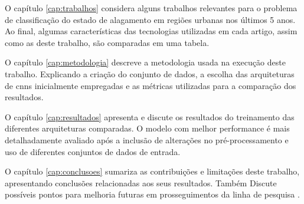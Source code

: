 O capítulo \ref{cap:trabalhos} considera alguns trabalhos relevantes para o problema de classificação do estado de alagamento em regiões urbanas nos últimos 5 anos. 
Ao final, algumas características das tecnologias utilizadas em cada artigo, assim como as deste trabalho, são comparadas em uma tabela.

O capítulo \ref{cap:metodologia} descreve a metodologia usada na execução deste trabalho. 
Explicando a criação do conjunto de dados, a escolha das arquiteturas de \acrshort{cnn}s inicialmente empregadas e as métricas utilizadas para a comparação dos resultados.

O capítulo \ref{cap:resultados} apresenta e discute os resultados do treinamento das diferentes arquiteturas comparadas. 
O modelo com melhor performance é mais detalhadamente avaliado após a inclusão de alterações no pré-processamento e uso de diferentes conjuntos de dados de entrada.

O capítulo \ref{cap:conclusoes} sumariza as contribuições e limitações deste trabalho, apresentando conclusões relacionadas aos seus resultados. 
Também Discute possíveis pontos para melhoria futuras em prosseguimentos da linha de pesquisa .